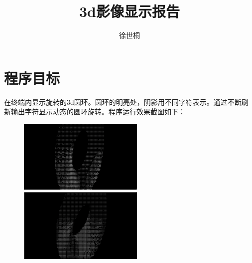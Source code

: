 \documentclass[UTF8]{ctexart}
\title{3d影像显示报告}
\author{徐世桐}
\date{}
\begin{document}
\maketitle

\section{程序目标}
在终端内显示旋转的3d圆环。圆环的明亮处，阴影用不同字符表示。通过不断刷新输出字符显示动态的圆环旋转。程序运行效果截图如下：\\

\begin{figure}[htbp]
  \centering
  \begin{minipage}[t]{0.48\textwidth}
    \centering
    \includegraphics[width=6cm]{images/donout1.png}
  \end{minipage}
  \begin{minipage}[t]{0.48\textwidth}
    \centering
    \includegraphics[width=6cm]{images/donout2.png}
  \end{minipage}
\end{figure}
\end{document}
